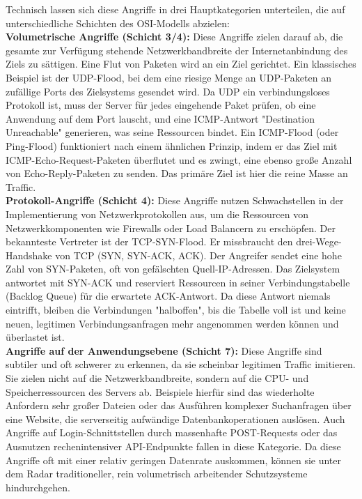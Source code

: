 Technisch lassen sich diese Angriffe in drei Hauptkategorien unterteilen, die auf unterschiedliche Schichten des OSI-Modells abzielen:\\

\textbf{Volumetrische Angriffe (Schicht 3/4):} Diese Angriffe zielen darauf ab, die gesamte zur Verfügung stehende Netzwerkbandbreite der Internetanbindung des Ziels zu sättigen. Eine Flut von Paketen wird an ein Ziel gerichtet. Ein klassisches Beispiel ist der UDP-Flood, bei dem eine riesige Menge an UDP-Paketen an zufällige Ports des Zielsystems gesendet wird. Da UDP ein verbindungsloses Protokoll ist, muss der Server für jedes eingehende Paket prüfen, ob eine Anwendung auf dem Port lauscht, und eine ICMP-Antwort "Destination Unreachable" generieren, was seine Ressourcen bindet. Ein ICMP-Flood (oder Ping-Flood) funktioniert nach einem ähnlichen Prinzip, indem er das Ziel mit ICMP-Echo-Request-Paketen überflutet und es zwingt, eine ebenso große Anzahl von Echo-Reply-Paketen zu senden. Das primäre Ziel ist hier die reine Masse an Traffic. \\

\textbf{Protokoll-Angriffe (Schicht 4):} Diese Angriffe nutzen Schwachstellen in der Implementierung von Netzwerkprotokollen aus, um die Ressourcen von Netzwerkkomponenten wie Firewalls oder Load Balancern zu erschöpfen. Der bekannteste Vertreter ist der TCP-SYN-Flood. Er missbraucht den drei-Wege-Handshake von TCP (SYN, SYN-ACK, ACK). Der Angreifer sendet eine hohe Zahl von SYN-Paketen, oft von gefälschten Quell-IP-Adressen. Das Zielsystem antwortet mit SYN-ACK und reserviert Ressourcen in seiner Verbindungstabelle (Backlog Queue) für die erwartete ACK-Antwort. Da diese Antwort niemals eintrifft, bleiben die Verbindungen "halboffen", bis die Tabelle voll ist und keine neuen, legitimen Verbindungsanfragen mehr angenommen werden können und überlastet ist. \\

\textbf{Angriffe auf der Anwendungsebene (Schicht 7):} Diese Angriffe sind subtiler und oft schwerer zu erkennen, da sie scheinbar legitimen Traffic imitieren. Sie zielen nicht auf die Netzwerkbandbreite, sondern auf die CPU- und Speicherressourcen des Servers ab. Beispiele hierfür sind das wiederholte Anfordern sehr großer Dateien oder das Ausführen komplexer Suchanfragen über eine Website, die serverseitig aufwändige Datenbankoperationen auslösen. Auch Angriffe auf Login-Schnittstellen durch massenhafte POST-Requests oder das Ausnutzen rechenintensiver API-Endpunkte fallen in diese Kategorie. Da diese Angriffe oft mit einer relativ geringen Datenrate auskommen, können sie unter dem Radar traditioneller, rein volumetrisch arbeitender Schutzsysteme hindurchgehen.\\ \cite{cloudflare1,rfc1} 

